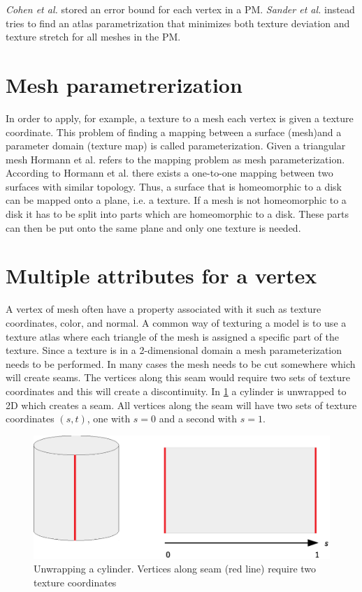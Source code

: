 \emph{Cohen et al.} \cite{cohen1998appearance} stored an error bound for each vertex in a PM. \emph{Sander et al.} \cite{sander2001texture} instead tries to find an atlas parametrization that minimizes both texture deviation and texture stretch for all meshes in the PM.


\section{Mesh parametrerization} \label{sec:mesh_parametrization}
In order to apply, for example, a texture to a mesh each vertex is given a texture coordinate. This problem of finding a mapping between a surface (mesh)and a parameter domain (texture map) is called parameterization. Given a triangular mesh Hormann et al. \cite{hormann2007mesh} refers to the mapping problem as mesh parameterization. According to Hormann et al. there exists a one-to-one mapping between two surfaces with similar topology. Thus, a surface that is homeomorphic to a disk can be mapped onto a plane, i.e. a texture. If a mesh is not homeomorphic to a disk it has to be split into parts which are homeomorphic to a disk. These parts can then be put onto the same plane and only one texture is needed.

\section{Multiple attributes for a vertex} \label{sec:vertex_with_multi_attributes}
A vertex of mesh often have a property associated with it such as texture coordinates, color, and normal. A common way of texturing a model is to use a texture atlas where each triangle of the mesh is assigned a specific part of the texture. Since a texture is in a 2-dimensional domain a mesh parameterization needs to be performed. In many cases the mesh needs to be cut somewhere which will create seams. The vertices along this seam would require two sets of texture coordinates and this will create a discontinuity. In \cref{fig:cylinder_unwrap} a cylinder is unwrapped to 2D which creates a seam. All vertices along the seam will have two sets of texture coordinates $(s,t)$, one with $s=0$ and a second with $s=1$.


\begin{figure}[h]
    \centering
    \includegraphics[width=.8\textwidth]{figures/cylinder_unwrap.eps}
    \caption{Unwrapping a cylinder. Vertices along seam (red line) require two texture coordinates}
    \label{fig:cylinder_unwrap}
\end{figure}

